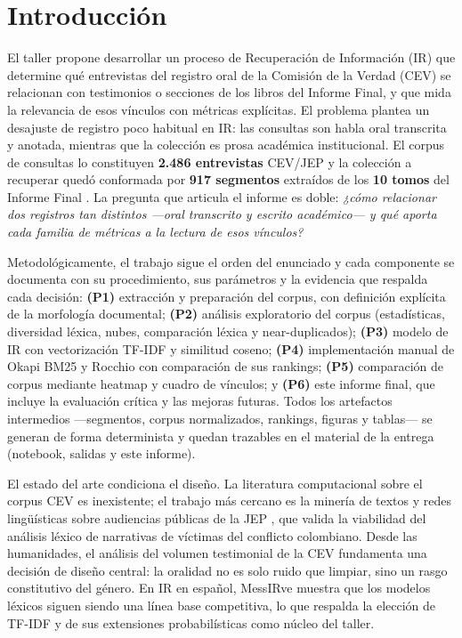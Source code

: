 \documentclass[11pt]{tg_usta}
\begin{document}
\section{Introducción}

El taller propone desarrollar un proceso de Recuperación de Información (IR) que determine qué entrevistas del registro oral de la Comisión de la Verdad (CEV) se relacionan con testimonios o secciones de los libros del Informe Final, y que mida la relevancia de esos vínculos con métricas explícitas. El problema plantea un desajuste de registro poco habitual en IR: las consultas son habla oral transcrita y anotada, mientras que la colección es prosa académica institucional. El corpus de consultas lo constituyen \textbf{2.486 entrevistas} CEV/JEP y la colección a recuperar quedó conformada por \textbf{917 segmentos} extraídos de los \textbf{10 tomos} del Informe Final \cite{cev2022informe}. La pregunta que articula el informe es doble: \textit{¿cómo relacionar dos registros tan distintos ---oral transcrito y escrito académico--- y qué aporta cada familia de métricas a la lectura de esos vínculos?}

Metodológicamente, el trabajo sigue el orden del enunciado y cada componente se documenta con su procedimiento, sus parámetros y la evidencia que respalda cada decisión: \textbf{(P1)} extracción y preparación del corpus, con definición explícita de la morfología documental; \textbf{(P2)} análisis exploratorio del corpus (estadísticas, diversidad léxica, nubes, comparación léxica y near-duplicados); \textbf{(P3)} modelo de IR con vectorización TF-IDF y similitud coseno; \textbf{(P4)} implementación manual de Okapi BM25 y Rocchio con comparación de sus rankings; \textbf{(P5)} comparación de corpus mediante heatmap y cuadro de vínculos; y \textbf{(P6)} este informe final, que incluye la evaluación crítica y las mejoras futuras. Todos los artefactos intermedios ---segmentos, corpus normalizados, rankings, figuras y tablas--- se generan de forma determinista y quedan trazables en el material de la entrega (notebook, salidas y este informe).

El estado del arte condiciona el diseño. La literatura computacional sobre el corpus CEV es inexistente; el trabajo más cercano es la minería de textos y redes lingüísticas sobre audiencias públicas de la JEP \cite{sosa2025constructing}, que valida la viabilidad del análisis léxico de narrativas de víctimas del conflicto colombiano. Desde las humanidades, el análisis del volumen testimonial de la CEV \cite{castillejo2023escuchar} fundamenta una decisión de diseño central: la oralidad no es solo ruido que limpiar, sino un rasgo constitutivo del género. En IR en español, MessIRve \cite{valentini2024messirve} muestra que los modelos léxicos siguen siendo una línea base competitiva, lo que respalda la elección de TF-IDF \cite{salton1988term} y de sus extensiones probabilísticas \cite{robertson2009probabilistic} como núcleo del taller.
\end{document}
